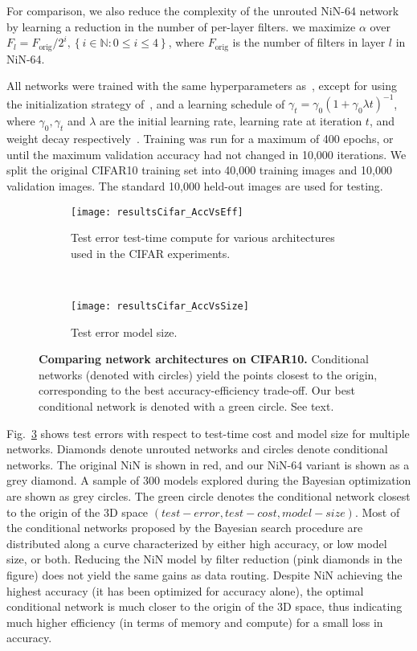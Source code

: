 \documentclass[thesis]{subfiles}
\begin{document}
For comparison, we also reduce the complexity of the unrouted NiN-64 network by learning a reduction in the number of per-layer filters. 
\ie we maximize $\alpha$ over $F_l = F_\textrm{orig}/2^i, \left\{i\in \mathbb{N} : 0 \le i \le 4\right\}$, where $F_\textrm{orig}$ is the number of filters in layer $l$ in NiN-64. 

All networks were trained with the same hyperparameters as~\cite{Lin2013NiN}, 
except for using the initialization strategy of~\cite{He2015delving}, 
and a learning schedule of $\gamma_t = \gamma_0(1+\gamma_0\lambda t)^{-1}$, where $\gamma_0,\gamma_t$ and $\lambda$ are the initial learning rate, learning rate at iteration $t$, and weight decay respectively~\cite{Bottou2012sgdtricks}. Training was run for a maximum of 400 epochs, or until the maximum validation accuracy had not changed in 10,000 iterations. 
We split the original CIFAR10 training set into 40,000 training images and 
10,000 validation images. 
The standard 10,000 held-out images are used for testing.


\begin{figure}[htbp!] 
\centering
\begin{subfigure}[b]{\textwidth}
   \centering
   \texttt{[image: resultsCifar\_AccVsEff]}
   \caption{Test error \vs test-time compute for various architectures used in the CIFAR experiments.}
   \label{fig:resultsCifar_AccVsEff}
\end{subfigure}
~
\begin{subfigure}[b]{\textwidth}
   \centering
   \texttt{[image: resultsCifar\_AccVsSize]}
   \caption{Test error \vs model size.}
   \label{fig:resultsCifar_AccVsSize}
\end{subfigure}
\caption{{\bf Comparing network architectures on CIFAR10.} Conditional networks (denoted with circles) yield the points closest to the origin, corresponding to the best accuracy-efficiency trade-off. Our best conditional network is denoted with a green circle. See text.}
\label{fig:Cifar_results}
\end{figure}
%
Fig.~\ref{fig:Cifar_results} shows test errors with respect to test-time cost and model size for multiple networks.
Diamonds denote unrouted networks and circles denote conditional networks. 
The original NiN is shown in red, and our NiN-64 variant is shown as a grey diamond.
A sample of 300 models explored during the Bayesian optimization are shown as grey circles.
The green circle denotes the conditional network closest to the origin of the 
3D space $(test-error,test-cost,model-size)$.
Most of the conditional networks proposed by the Bayesian search procedure are distributed along a curve characterized by either high accuracy, or low model size, or both. 
Reducing the NiN model by filter reduction (pink diamonds in the figure) does not yield the same gains as data routing.
Despite NiN achieving the highest accuracy (it has been optimized for accuracy alone), the optimal conditional network is much closer to the origin of the 3D space, thus indicating much higher efficiency (in terms of memory and compute) for a small loss in accuracy.




\end{document}
